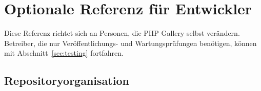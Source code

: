 \documentclass[11pt,a4paper]{article}
\begin{document}

\section{Optionale Referenz für Entwickler}
\label{sec:development}

Diese Referenz richtet sich an Personen, die PHP Gallery selbst verändern.
Betreiber, die nur Veröffentlichungs- und Wartungsprüfungen benötigen, können
mit Abschnitt~\ref{sec:testing} fortfahren.

\subsection{Repositoryorganisation}
\end{document}
